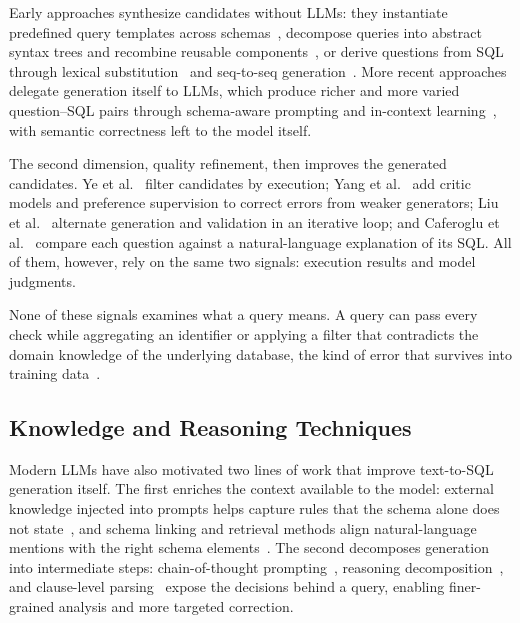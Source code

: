 \documentclass[letterpaper,journal]{IEEEtran}
\begin{document}
Early approaches synthesize candidates without LLMs: they instantiate predefined query templates across schemas~\cite{yu2021grappa}, decompose queries into abstract syntax trees and recombine reusable components~\cite{wu2021,baumgartner2024synql,guo2025sqlforge}, or derive questions from SQL through lexical substitution~\cite{yang2021hierarchical} and seq-to-seq generation~\cite{guo2018question}. More recent approaches delegate generation itself to LLMs, which produce richer and more varied question--SQL pairs through schema-aware prompting and in-context learning~\cite{ye2023symgen,yang2024synthesizing,liu2024reformer,caferoglu2025singsql}, with semantic correctness left to the model itself.

The second dimension, quality refinement, then improves the generated candidates. Ye et al.~\cite{ye2023symgen} filter candidates by execution; Yang et al.~\cite{yang2024synthesizing} add critic models and preference supervision to correct errors from weaker generators; Liu et al.~\cite{liu2024reformer} alternate generation and validation in an iterative loop; and Caferoglu et al.~\cite{caferoglu2025singsql} compare each question against a natural-language explanation of its SQL. All of them, however, rely on the same two signals: execution results and model judgments.

None of these signals examines what a query means. A query can pass every check while aggregating an identifier or applying a filter that contradicts the domain knowledge of the underlying database, the kind of error that survives into training data~\cite{liu2025nl2sqlbugs}.

\subsection{Knowledge and Reasoning Techniques}

Modern LLMs have also motivated two lines of work that improve text-to-SQL generation itself. The first enriches the context available to the model: external knowledge injected into prompts helps capture rules that the schema alone does not state~\cite{hong2024knowledge,han2024bridging}, and schema linking and retrieval methods align natural-language mentions with the right schema elements~\cite{wang2025linkalign,glass2025extractive,fan2024confidence,guo2025multipattern,zhang2025structure}. The second decomposes generation into intermediate steps: chain-of-thought prompting~\cite{wei2022chain,chang2023prompt}, reasoning decomposition~\cite{sui2025chain,dai2025parsql}, and clause-level parsing~\cite{xu2024cop,pourreza2025chasesql} expose the decisions behind a query, enabling finer-grained analysis and more targeted correction.
\end{document}
